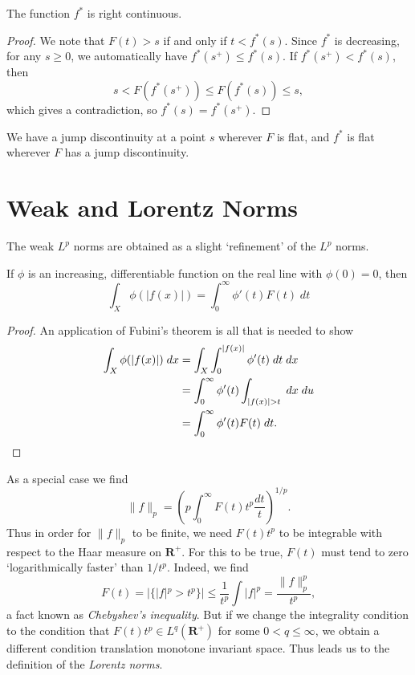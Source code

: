 \begin{theorem}
    The function $f^*$ is right continuous.
\end{theorem}
\begin{proof}
    We note that $F(t) > s$ if and only if $t < f^*(s)$. Since $f^*$ is decreasing, for any $s \geq 0$, we automatically have $f^*(s^+) \leq f^*(s)$. If $f^*(s^+) < f^*(s)$, then
    \[ s < F \left( f^*(s^+) \right) \leq F(f^*(s)) \leq s, \]
    which gives a contradiction, so $f^*(s) = f^*(s^+)$.
\end{proof}

\begin{remark}
    We have a jump discontinuity at a point $s$ wherever $F$ is flat, and $f^*$ is flat wherever $F$ has a jump discontinuity.
\end{remark}

\section{Weak and Lorentz Norms}

The weak $L^p$ norms are obtained as a slight `refinement' of the $L^p$ norms.

\begin{theorem}
  If $\phi$ is an increasing, differentiable function on the real line with $\phi(0) = 0$, then
  \[ \int_X \phi(|f(x)|) = \int_0^\infty \phi'(t) F(t)\; dt \]
\end{theorem}
\begin{proof}
  An application of Fubini's theorem is all that is needed to show
  \begin{align*}
    \int_X \phi(|f(x)|)\; dx &= \int_X \int_0^{|f(x)|} \phi'(t)\; dt\; dx\\
    &= \int_0^\infty \phi'(t) \int_{|f(x)| > t}\; dx\; du\\
    &= \int_0^\infty \phi'(t) F(t)\; dt. \qedhere
  \end{align*}
\end{proof}

As a special case we find
%
\[ \| f \|_p = \left( p \int_0^\infty F(t) t^p \frac{dt}{t} \right)^{1/p}. \]
%
Thus in order for $\| f \|_p$ to be finite, we need $F(t) t^p$ to be integrable with respect to the Haar measure on $\mathbf{R}^+$. For this to be true, $F(t)$ must tend to zero `logarithmically faster' than $1/t^p$. Indeed, we find
%
\[ F(t) = |\{ |f|^p > t^p \}| \leq \frac{1}{t^p} \int |f|^p = \frac{\| f \|_p^p}{t^p}, \]
%
a fact known as \emph{Chebyshev's inequality}. But if we change the integrality condition to the condition that $F(t) t^p \in L^q(\mathbf{R}^+)$ for some $0 < q \leq \infty$, we obtain a different condition translation monotone invariant space. Thus leads us to the definition of the \emph{Lorentz norms}.

